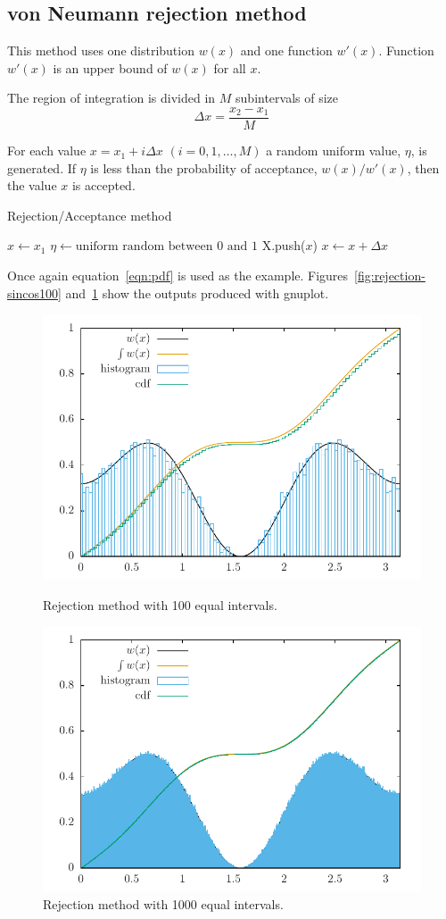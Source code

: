 \documentclass[11pt]{article}
\begin{document}
\subsection{von Neumann rejection method}
This method uses one distribution $w(x)$ and one function $w'(x)$. Function $w'(x)$ is an upper bound of $w(x)$ for all $x$.

The region of integration is divided in $M$ subintervals of size
\begin{equation*}
  \Delta x = \frac{x_2-x_1}{M}
\end{equation*}

For each value $x = x_1 + i\Delta x$ $(i=0,1,\dots,M)$  a random uniform value, $\eta$, is generated. If $\eta$ is less than the probability of acceptance, $w(x)/w'(x)$, then the value $x$ is accepted.
\begin{algorithm}
 \caption{Rejection/Acceptance method} 
 \label{rejectionAlgorithm}
 \begin{algorithmic}[1]
 \State $x\leftarrow x_1$
 \State $\eta\leftarrow \text{uniform random between 0 and 1}$
 \State X.push($x$)
 \EndIf
 \State $x \leftarrow x + \Delta x$
 \EndWhile
 \end{algorithmic}
\end{algorithm}

Once again equation~\ref{eqn:pdf} is used as the example. Figures~\ref{fig:rejection-sincos100} and~\ref{fig:rejection-sincos1000} show the outputs produced with gnuplot.
\begin{figure}[H]
  \centering

  \includegraphics[width=.6\linewidth]{rejection-sincos100}
  \caption{Rejection method with 100 equal intervals.}
\label{fig:rejection-sincos100}

  \includegraphics[width=.6\linewidth]{rejection-sincos1000}
  \caption{Rejection method with 1000 equal intervals.}
\label{fig:rejection-sincos1000}
\end{figure}
\end{document}
